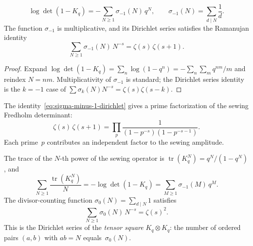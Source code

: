 \begin{proposition}
\label{prop:divisor-sum-decomposition}
\ClaimStatusProvedHere
\begin{equation}\label{eq:log-det-sigma}
 \log\det(1-K_q)
 = -\sum_{N\ge1}\sigma_{-1}(N)\,q^N,
 \qquad
 \sigma_{-1}(N) = \sum_{d\mid N}\frac{1}{d}.
\end{equation}
The function $\sigma_{-1}$ is multiplicative, and its Dirichlet series
satisfies the Ramanujan identity
\begin{equation}\label{eq:sigma-minus-1-dirichlet}
 \sum_{N\ge1}\sigma_{-1}(N)\,N^{-s}
 = \zeta(s)\,\zeta(s+1).
\end{equation}
\end{proposition}

\begin{proof}
Expand
$\log\det(1-K_q)=\sum_n\log(1-q^n)=-\sum_n\sum_m q^{nm}/m$
and reindex $N=nm$. Multiplicativity of $\sigma_{-1}$ is standard;
the Dirichlet series identity is the $k=-1$ case of
$\sum\sigma_k(N)N^{-s}=\zeta(s)\zeta(s-k)$.
\end{proof}

\begin{corollary}
\label{cor:sewing-euler-product}
\ClaimStatusProvedElsewhere
The identity~\eqref{eq:sigma-minus-1-dirichlet} gives a prime
factorization of the sewing Fredholm determinant:
\[
 \zeta(s)\,\zeta(s+1)
 = \prod_p \frac{1}{(1-p^{-s})(1-p^{-s-1})}.
\]
Each prime~$p$ contributes an independent factor to the sewing
amplitude.
\end{corollary}

\begin{proposition}
\label{prop:sewing-trace-formula}
\ClaimStatusProvedHere
{}
The trace of the $N$-th power of the sewing operator is
$\operatorname{tr}(K_q^N) = q^N/(1-q^N)$, and
\begin{equation}\label{eq:sewing-trace}
 \sum_{N\ge1} \frac{\operatorname{tr}(K_q^N)}{N}
 = -\log\det(1-K_q)
 = \sum_{M\ge1} \sigma_{-1}(M)\,q^M.
\end{equation}
The divisor-counting function $\sigma_0(N) = \sum_{d\mid N}1$ satisfies
\begin{equation}\label{eq:sigma0-zeta-squared}
 \sum_{N\ge1}\sigma_0(N)\,N^{-s} = \zeta(s)^2.
\end{equation}
This is the Dirichlet series of the \emph{tensor square}
$K_q\otimes K_q$: the number of ordered pairs $(a,b)$ with
$ab = N$ equals~$\sigma_0(N)$.
\end{proposition}

